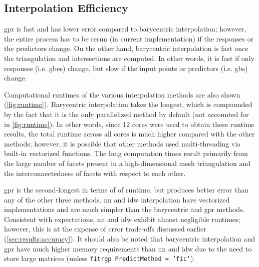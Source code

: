 \documentclass[preprint,12pt]{elsarticle}
\begin{document}
\begin{figure}
    \label{fig:brkerror}
\end{figure}

\subsection{Interpolation Efficiency}
\label{sec:results:efficiency}


\Gls{gpr} is fast and has lower error compared to barycentric interpolation; however, the entire process has to be rerun (in current implementation) if the responses or the predictors change. On the other hand, barycentric interpolation is fast once the triangulation and intersections are computed. In other words, it is fast if only responses (i.e. \glspl{gbe}) change, but slow if the input points or predictors (i.e. \glspl{gb}) change.

Computational runtimes of the various interpolation methods are also shown (\cref{fig:runtime}). Barycentric interpolation takes the longest, which is compounded by the fact that it is the only parallelized method by default (not accounted for in \cref{fig:runtime}). In other words, since 12 cores were used to obtain these runtime results, the total runtime across all cores is much higher compared with the other methods; however, it is possible that other methods used multi-threading via built-in vectorized functions. The long computation times result primarily from the large number of facets present in a high-dimensional mesh triangulation and the interconnectedness of facets with respect to each other.

\Gls{gpr} is the second-longest in terms of of runtime, but produces better error than any of the other three methods. \Gls{nn} and \gls{idw} interpolation have vectorized implementations and are much simpler than the barycentric and \gls{gpr} methods. Consistent with expectations, \gls{nn} and \gls{idw} exhibit almost negligible runtimes; however, this is at the expense of error trade-offs discussed earlier (\cref{sec:results:accuracy}). It should also be noted that barycentric interpolation and \gls{gpr} have much higher memory requirements than \gls{nn} and \gls{idw} due to the need to store large matrices (unless \texttt{fitrgp PredictMethod = 'fic'}).
\end{document}
